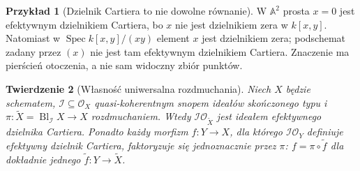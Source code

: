 \documentclass[11pt,a4paper,openany]{report}
\numberwithin{equation}{section}
\theoremstyle{plain}
\newtheorem{twierdzenie}{Twierdzenie}[section]
\theoremstyle{definition}
\newtheorem{przyklad}[twierdzenie]{Przykład}
\theoremstyle{remark}
\newcommand{\A}{\mathbb A}
\newcommand{\Spec}{\operatorname{Spec}}
\begin{document}
\begin{przyklad}[Dzielnik Cartiera to nie dowolne równanie]
W $\A^2$ prosta $x=0$ jest efektywnym dzielnikiem Cartiera,
bo $x$ nie jest dzielnikiem zera w $k[x,y]$.
Natomiast w $\Spec k[x,y]/(xy)$ element $x$ jest dzielnikiem
zera; podschemat zadany przez $(x)$ nie jest tam efektywnym
dzielnikiem Cartiera. Znaczenie ma pierścień otoczenia,
a nie sam widoczny zbiór punktów.
\end{przyklad}

\begin{twierdzenie}[Własność uniwersalna rozdmuchania]
\label{tw:ga5-universal}
Niech $X$ będzie schematem, $\mathcal I\subseteq\mathcal O_X$
quasi-koherentnym snopem ideałów skończonego typu i
$\pi:\widetilde X=\operatorname{Bl}_{\mathcal I}X\to X$
rozdmuchaniem. Wtedy $\mathcal I\mathcal O_{\widetilde X}$
jest ideałem efektywnego dzielnika Cartiera. Ponadto
każdy morfizm $f:Y\to X$, dla którego
$\mathcal I\mathcal O_Y$ definiuje efektywny dzielnik
Cartiera, faktoryzuje się \emph{jednoznacznie} przez $\pi$:
$ f=\pi\circ\widetilde f$ dla dokładnie jednego
$\widetilde f:Y\to\widetilde X$.
\end{twierdzenie}
\end{document}
